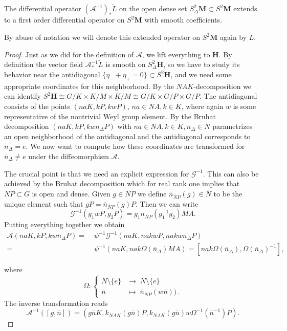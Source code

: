 \documentclass[AHL, Unicode, longabstracts, published]{cedram}
\newcommand{\mc}{\mathcal}
\newcommand{\til}{\widetilde}
\newcommand{\bn}{{\overline{n}}}
\newcommand{\bN}{{\overline{N}}}
\newcommand{\hspc}{\mathbf{H}}
\begin{document}
\begin{lemm}\label{lem:smooth_extension}
The differential operator $(\mathcal A^{-1})_*\til L$ on the open dense set $S^2_\Delta\mathbf M\subset S^2\mathbf M$ extends to a first order differential operator on $S^2\mathbf M$ with smooth coefficients.
\end{lemm}

By abuse of notation we will denote this extended operator on $S^2\mathbf M$ again by $\til L$.

\begin{proof}
Just as we did for the definition of $\mc{A}$, we lift everything to $\hspc$. By definition the vector field $\mathcal A^{-1}_*\til L$ is smooth on $S^2_\Delta \hspc$, so we have to study its behavior near the antidiagonal $\{\eta_-+\eta_+=0\}\subset S^2\hspc$, and we need some appropriate coordinates for this neighborhood. By the $NAK$-decomposition we can identify $S^2\hspc \cong G/K\times K/M\times K/M \cong G/K\times G/P\times G/P $. The antidiagonal consists of the points $(naK, kP, kwP)$, $na\in NA, k\in K$, where again $w$ is some representative of the nontrivial Weyl group element. By the Bruhat decomposition $(naK, kP, kw\bn_\Delta P)$ with $na\in NA, k\in K, \bn_\Delta\in\bN$ parametrizes an open neighborhood of the antidiagonal and the antidiagonal corresponds to $\bn_\Delta=e$. We now want to compute how these coordinates are transformed for $\bn_\Delta \neq e$ under the diffeomorphism $\mathcal A$.

The crucial point is that we need an explicit expression for $\mathcal G^{-1}$. This can also be achieved by the Bruhat decomposition which for real rank one implies that $\bN P \subset G$ is open and dense. Given $g\in\bN P$ we define $\overline{n}_{\bN P}(g)\in\bN$ to be the unique element such that $gP = \overline{n}_{\bN P}(g)P$. Then we can write
\[
\mathcal G^{-1}(g_1wP, g_2P) = g_1\overline{n}_{\bN P}\left(g_1^{-1}g_2\right)MA.
\]
Putting everything together we obtain
\begin{align*}
\mathcal A\left(naK, kP, kw\bn_\Delta P\right) =\;&
\psi^{-1}\mc{G}^{-1}\left(naK,nakwP,nakw\bn_{\Delta}P\right)\\
=\;& \psi^{-1}\left(naK, nak\Omega(\bn_{\Delta})MA\right) = \left[nak\Omega(\bn_\Delta),
\Omega(\bn_\Delta)^{-1}\right],
\end{align*}

where
\[
\Omega:
\begin{cases}
\bN\setminus\{e\} &\rightarrow\;\bN\setminus\{e\}\\
\bn &\mapsto\;\overline{n}_{\bN P}(w\bn))\,.
\end{cases}
\]
The inverse transformation reads
\begin{equation}\label{eq:pairing_A_inv}
\mathcal A^{-1}([g, \bn]) = \left(g\bn K, k_{NAK}(g\bn) P, k_{NAK}(g\bn)w
\Omega^{-1}\left(\bn^{-1}\right)P\right).
\end{equation}


\end{proof}
\end{document}
